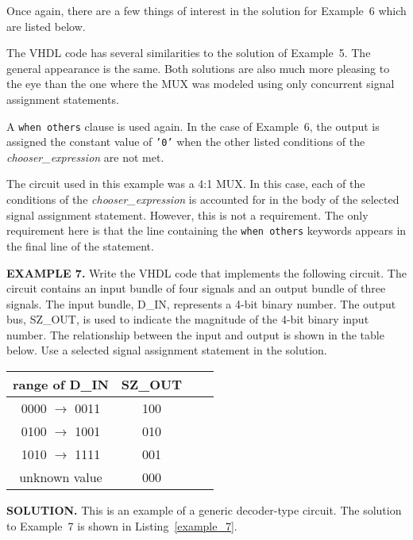Once again, there are a few things of interest in the solution for Example~6 which are listed below.
\begin{my_list}
\item The VHDL code has several similarities to the solution of Example~5. The general appearance is the same. Both solutions are also much more pleasing to the eye than the one where the MUX was modeled using only concurrent signal assignment statements.
\item A \texttt{when others} clause is used again. In the case of Example~6, the output is assigned the constant value of \texttt{'0'} when the other listed conditions of the \textit{chooser\_expression} are not met.
\item The circuit used in this example was a 4:1 MUX. In this case, each of the conditions of the \textit{chooser\_expression} is accounted for in the body of the selected signal assignment statement. However, this is not a requirement. The only requirement here is that the line containing the \texttt{when others} keywords appears in the final line of the statement.
\end{my_list}

\begin{leftbar}
\noindent
\textbf{EXAMPLE 7.} Write the VHDL code that implements the following circuit. The circuit contains an input bundle of four signals and an output bundle of three signals. The input bundle, D\_IN, represents a 4-bit binary number. The output bus, SZ\_OUT, is used to indicate the magnitude of the 4-bit binary input number. The relationship between the input and output is shown in the table below. Use a selected signal assignment statement in the solution.

\centering\vspace{5pt}
\begin{tabular}{c*{2}{c}r}
range of D\_IN  & SZ\_OUT \\
\hline
0000 $\rightarrow$ 0011 & 100 \\
0100 $\rightarrow$ 1001 & 010 \\
1010 $\rightarrow$ 1111 & 001 \\
unknown value		& 000 \\
\end{tabular}
\end{leftbar}
\noindent
\textbf{SOLUTION.} This is an example of a generic decoder-type circuit. The solution to Example~7 is shown in Listing~\ref{example_7}.

\noindent
\begin{minipage}{0.99\linewidth}
\centering
{}
\end{minipage}

